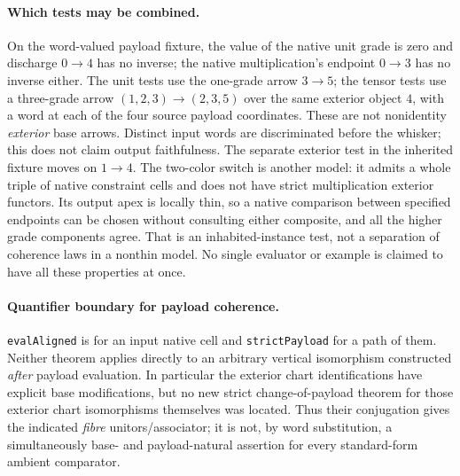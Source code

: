 \documentclass[11pt]{article}
\begin{document}
\paragraph{Which tests may be combined.}
On the word-valued payload fixture, the value of the native unit grade is zero
and discharge $0\to4$ has no inverse; the native multiplication's endpoint
$0\to3$ has no inverse either. The unit tests use the one-grade arrow
$3\to5$; the tensor tests use a three-grade arrow
$(1,2,3)\to(2,3,5)$ over the same exterior object $4$, with a word at each
of the four source payload coordinates. These are not nonidentity
\emph{exterior} base arrows. Distinct input words are discriminated before the
whisker; this does not claim output faithfulness. The separate exterior test
in the inherited fixture moves on $1\to4$. The two-color switch is another
model: it admits a whole triple of native constraint cells and does not have
strict multiplication exterior functors. Its output apex is locally thin, so
a native comparison between specified endpoints can be chosen without
consulting either composite, and all the higher grade components agree.
That is an inhabited-instance test, not a separation of coherence laws in a
nonthin model. No single evaluator or example is claimed to have all these
properties at once.
\paragraph{Quantifier boundary for payload coherence.}
\texttt{evalAligned} is for an input native cell and \texttt{strictPayload} for
a path of them. Neither theorem applies directly to an arbitrary vertical
isomorphism constructed \emph{after} payload evaluation. In particular the
exterior chart identifications have explicit base modifications, but no new
strict change-of-payload theorem for those exterior chart isomorphisms
themselves was located. Thus their conjugation gives the indicated
\emph{fibre} unitors/associator; it is not, by word substitution, a
simultaneously base- and payload-natural assertion for every standard-form
ambient comparator.
\end{document}

